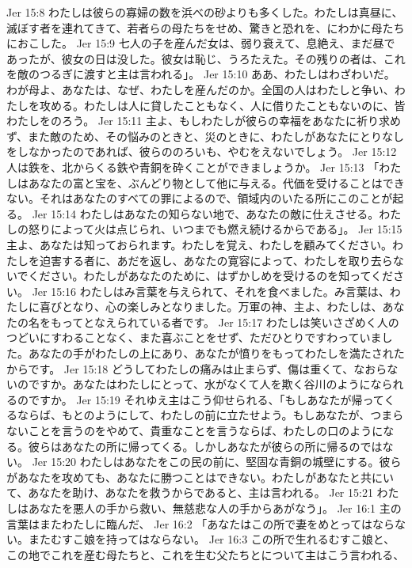 Jer 15:8  わたしは彼らの寡婦の数を浜べの砂よりも多くした。わたしは真昼に、滅ぼす者を連れてきて、若者らの母たちをせめ、驚きと恐れを、にわかに母たちにおこした。
Jer 15:9  七人の子を産んだ女は、弱り衰えて、息絶え、まだ昼であったが、彼女の日は没した。彼女は恥じ、うろたえた。その残りの者は、これを敵のつるぎに渡すと主は言われる」。
Jer 15:10  ああ、わたしはわざわいだ。わが母よ、あなたは、なぜ、わたしを産んだのか。全国の人はわたしと争い、わたしを攻める。わたしは人に貸したこともなく、人に借りたこともないのに、皆わたしをのろう。
Jer 15:11  主よ、もしわたしが彼らの幸福をあなたに祈り求めず、また敵のため、その悩みのときと、災のときに、わたしがあなたにとりなしをしなかったのであれば、彼らののろいも、やむをえないでしょう。
Jer 15:12  人は鉄を、北からくる鉄や青銅を砕くことができましょうか。
Jer 15:13  「わたしはあなたの富と宝を、ぶんどり物として他に与える。代価を受けることはできない。それはあなたのすべての罪によるので、領域内のいたる所にこのことが起る。
Jer 15:14  わたしはあなたの知らない地で、あなたの敵に仕えさせる。わたしの怒りによって火は点じられ、いつまでも燃え続けるからである」。
Jer 15:15  主よ、あなたは知っておられます。わたしを覚え、わたしを顧みてください。わたしを迫害する者に、あだを返し、あなたの寛容によって、わたしを取り去らないでください。わたしがあなたのために、はずかしめを受けるのを知ってください。
Jer 15:16  わたしはみ言葉を与えられて、それを食べました。み言葉は、わたしに喜びとなり、心の楽しみとなりました。万軍の神、主よ、わたしは、あなたの名をもってとなえられている者です。
Jer 15:17  わたしは笑いさざめく人のつどいにすわることなく、また喜ぶことをせず、ただひとりですわっていました。あなたの手がわたしの上にあり、あなたが憤りをもってわたしを満たされたからです。
Jer 15:18  どうしてわたしの痛みは止まらず、傷は重くて、なおらないのですか。あなたはわたしにとって、水がなくて人を欺く谷川のようになられるのですか。
Jer 15:19  それゆえ主はこう仰せられる、「もしあなたが帰ってくるならば、もとのようにして、わたしの前に立たせよう。もしあなたが、つまらないことを言うのをやめて、貴重なことを言うならば、わたしの口のようになる。彼らはあなたの所に帰ってくる。しかしあなたが彼らの所に帰るのではない。
Jer 15:20  わたしはあなたをこの民の前に、堅固な青銅の城壁にする。彼らがあなたを攻めても、あなたに勝つことはできない。わたしがあなたと共にいて、あなたを助け、あなたを救うからであると、主は言われる。
Jer 15:21  わたしはあなたを悪人の手から救い、無慈悲な人の手からあがなう」。
Jer 16:1  主の言葉はまたわたしに臨んだ、
Jer 16:2  「あなたはこの所で妻をめとってはならない。またむすこ娘を持ってはならない。
Jer 16:3  この所で生れるむすこ娘と、この地でこれを産む母たちと、これを生む父たちとについて主はこう言われる、
